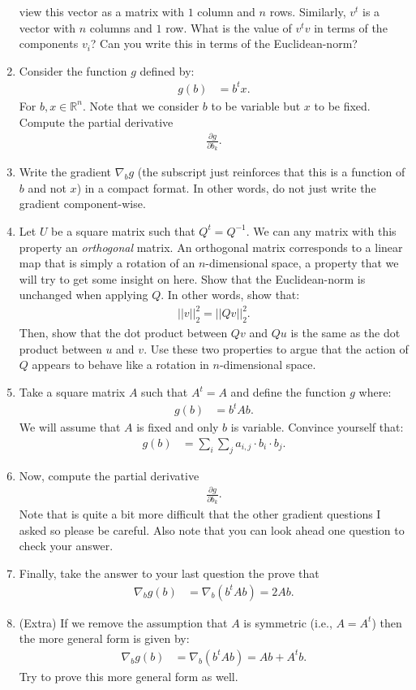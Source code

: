 \documentclass[12pt,hidelinks]{article}
\numberwithin{equation}{section}
\begin{document}
\begin{enumerate}
view this vector as a matrix with $1$ column and $n$ rows. Similarly, $v^t$
is a vector with $n$ columns and $1$ row. What is the value of $v^t v$ in terms
of the components $v_i$? Can you write this in terms of the Euclidean-norm?
\item Consider the function $g$ defined by:
\begin{align}
g(b) &= b^t x.
\end{align}
For $b, x \in \mathbb{R}^n$. Note that we consider $b$ to be variable but $x$
to be fixed. Compute the partial derivative
\begin{align}
\frac{\partial g}{\partial b_k}.
\end{align}
\item Write the gradient $\nabla_b g$ (the subscript just reinforces that this
is a function of $b$ and not $x$) in a compact format. In other words, do not
just write the gradient component-wise.
\item Let $U$ be a square matrix such that $Q^t = Q^{-1}$. We can any matrix
with this property an \textit{orthogonal} matrix. An orthogonal matrix corresponds
to a linear map that is simply a rotation of an $n$-dimensional space, a property
that we will try to get some insight on here. Show that the Euclidean-norm is
unchanged when applying $Q$. In other words, show that:
\begin{align}
||v||_2^2 = ||Q v ||_2^2.
\end{align}
Then, show that the dot product between $Qv$ and $Qu$ is the same as the dot
product between $u$ and $v$. Use these two properties to argue that the action of
$Q$ appears to behave like a rotation in $n$-dimensional space.
\item Take a square matrix $A$ such that $A^t = A$ and define the function $g$
where:
\begin{align}
g(b) &= b^t A b.
\end{align}
We will assume that $A$ is fixed and only $b$ is variable. Convince yourself
that:
\begin{align}
g(b) &= \sum_i \sum_j a_{i,j} \cdot b_i \cdot b_j.
\end{align}
\item Now, compute the partial derivative
\begin{align}
\frac{\partial g}{\partial b_k}.
\end{align}
Note that is quite a bit more difficult that the other gradient questions I asked
so please be careful. Also note that you can look ahead one question to check
your answer.
\item Finally, take the answer to your last question the prove that
\begin{align}
\nabla_b g (b) &= \nabla_b \left( b^t A b \right) = 2 A b.
\end{align}
\item (Extra) If we remove the assumption that $A$ is symmetric (i.e., $A = A^t$)
then the more general form is given by:
\begin{align}
\nabla_b g (b) &= \nabla_b \left( b^t A b \right) = A b + A^t b.
\end{align}
Try to prove this more general form as well.
\end{enumerate}
\end{document}
